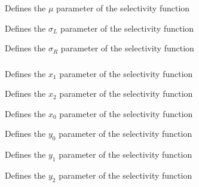 \subsubsection[Double-normal]{}

 {Defines the $\mu$ parameter of the selectivity function}

 {Defines the $\sigma_L$ parameter of the selectivity function}

 {Defines the $\sigma_R$ parameter of the selectivity function}

\subsubsection[Double-exponential]{}

 {Defines the $x_1$ parameter of the selectivity function}

 {Defines the $x_2$ parameter of the selectivity function}

 {Defines the $x_0$ parameter of the selectivity function}

 {Defines the $y_0$ parameter of the selectivity function}

 {Defines the $y_1$ parameter of the selectivity function}

 {Defines the $y_2$ parameter of the selectivity function}
